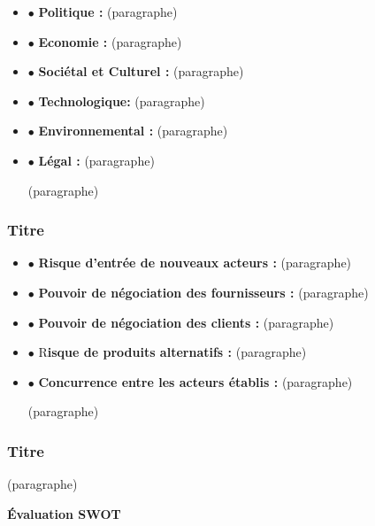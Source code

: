 \documentclass[a4paper]{article}
\begin{document}
\begin{itemize}

\item{$\bullet$  \textbf{Politique :} }
(paragraphe)
\item{$\bullet$  \textbf{Economie :} }
(paragraphe)
\item{$\bullet$  \textbf{Sociétal et Culturel :} }
(paragraphe)
\item{$\bullet$ \textbf{Technologique: }} 
(paragraphe)
\item{$\bullet$  \textbf{Environnemental :} } 
(paragraphe)
\item{$\bullet$  \textbf{Légal : }} 
(paragraphe)

(paragraphe)
\end{itemize}

\subsubsection{Titre}
\begin{itemize}
\item{$\bullet$ \textbf{Risque d'entrée de nouveaux acteurs :} } 
(paragraphe)
\item{$\bullet$ \textbf{Pouvoir de négociation des fournisseurs :} } 
(paragraphe)
\item{$\bullet$ \textbf{Pouvoir de négociation des clients :} } 
(paragraphe)
\item{$\bullet$ R\textbf{isque de produits alternatifs :} }
(paragraphe)
\item{$\bullet$ \textbf{Concurrence entre les acteurs établis :} }
(paragraphe)

(paragraphe)
\end{itemize}

\subsubsection{Titre}
(paragraphe)
\begin{center}
\textbf{Évaluation SWOT}
\end{center}
\end{document}
